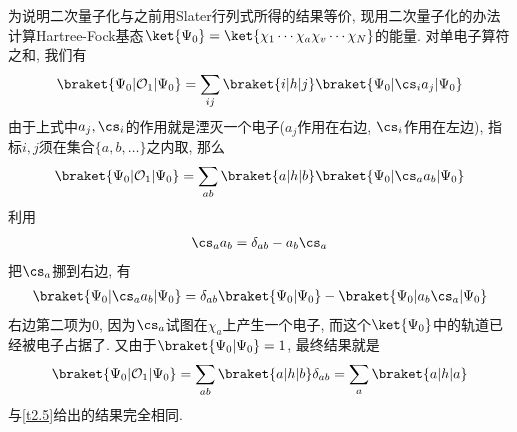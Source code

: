 
为说明二次量子化与之前用Slater行列式所得的结果等价, 
现用二次量子化的办法计算Hartree-Fock基态$\ket{\Psi_0} = \ket{\chi_1\cdots\chi_a\chi_v\cdots\chi_N}$的能量. 
对单电子算符之和, 
我们有
\begin{align}
\braket{\Psi_0|\mathcal{O}_1|\Psi_0} = \sum_{ij}\braket{i|h|j}\braket{\Psi_0|\cs_i a_j|\Psi_{0}}
\end{align}
由于上式中$a_j,\cs_i$的作用就是湮灭一个电子($a_j$作用在右边, 
$\cs_i$作用在左边), 
指标$i,j$须在集合$\{a,b,\ldots\}$之内取, 
那么
\begin{align}
\braket{\Psi_0|\mathcal{O}_1|\Psi_0} = \sum_{ab}\braket{a|h|b}\braket{\Psi_0|\cs_a a_b|\Psi_{0}}
\end{align}
利用
\begin{align}
\cs_a a_b = \delta_{ab} - a_b\cs_a \notag
\end{align}
把$\cs_a$挪到右边, 
有
\begin{align}
\braket{\Psi_0|\cs_a a_b|\Psi_0} = \delta_{ab}\braket{\Psi_0|\Psi_0} - \braket{\Psi_0|a_b\cs_a|\Psi_0}
\end{align}
右边第二项为$0$, 
因为$\cs_a$试图在$\chi_a$上产生一个电子, 
而这个$\ket{\Psi_0}$中的轨道已经被电子占据了. 
又由于$\braket{\Psi_0|\Psi_0} = 1$, 
最终结果就是
\begin{align}
\braket{\Psi_0|\mathcal{O}_1|\Psi_0} = \sum_{ab} \braket{a|h|b}\delta_{ab} = \sum_a\braket{a|h|a}
\end{align} 
与\autoref{t2.5}给出的结果完全相同.


